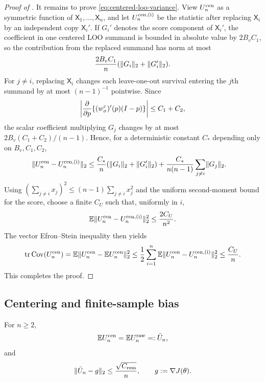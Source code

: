 \begin{proof}[Proof of ]
It remains to prove \eqref{eq:centered-loo-variance}.  View $U_n^{\rm cen}$ as a symmetric function of $\mathsf X_1,\ldots,\mathsf X_n$, and let $U_n^{\rm cen,(i)}$ be the statistic after replacing $\mathsf X_i$ by an independent copy $\mathsf X_i'$.  If $G_i'$ denotes the score component of $\mathsf X_i'$, the coefficient in one centered LOO summand is bounded in absolute value by $2B_vC_1$, so the contribution from the replaced summand has norm at most
\[
 \frac{2B_vC_1}{n}(\lVert G_i\rVert_2+\lVert G_i'\rVert_2).
\]
For $j\ne i$, replacing $\mathsf X_i$ changes each leave-one-out survival entering the $j$th summand by at most $(n-1)^{-1}$ pointwise.  Since
\[
 \left|\frac{\partial}{\partial p}\{(w_\sigma^\varepsilon)'(p)(I-p)\}\right|
 \le C_1+C_2,
\]
the scalar coefficient multiplying $G_j$ changes by at most
$2B_v(C_1+C_2)/(n-1)$.  Hence, for a deterministic constant $C_*$ depending only on $B_v,C_1,C_2$,
\begin{align*}
 \lVert U_n^{\rm cen}-U_n^{\rm cen,(i)}\rVert_2
 &\le \frac{C_*}{n}(\lVert G_i\rVert_2+\lVert G_i'\rVert_2)
 +\frac{C_*}{n(n-1)}\sum_{j\ne i}\lVert G_j\rVert_2.
\end{align*}
Using $(\sum_{j\ne i}x_j)^2\le(n-1)\sum_{j\ne i}x_j^2$ and the uniform second-moment bound for the score, choose a finite $C_U$ such that, uniformly in $i$,
\[
 \mathbb E\lVert U_n^{\rm cen}-U_n^{\rm cen,(i)}\rVert_2^2
 \le\frac{2C_U}{n^2}.
\]
The vector Efron--Stein inequality then yields
\[
 \operatorname{tr}\operatorname{Cov}(U_n^{\rm cen})
 =\mathbb E\lVert U_n^{\rm cen}-\mathbb E U_n^{\rm cen}\rVert_2^2
 \le\frac12\sum_{i=1}^{n}
 \mathbb E\lVert U_n^{\rm cen}-U_n^{\rm cen,(i)}\rVert_2^2
 \le\frac{C_U}{n}.
\]
This completes the proof.
\end{proof}


\subsection{Centering and finite-sample bias}

\begin{lemma}\label{lem:centering-expectation}
For $n\ge2$,
\begin{equation}\label{eq:centered-raw-mean}
 \mathbb E U_n^{\rm cen}=\mathbb E U_n^{\rm raw}=: \bar U_n,
\end{equation}
and
\begin{equation}\label{eq:loo-bias-order}
 \lVert\bar U_n-g\rVert_2\le \frac{\sqrt{C_{\rm rem}}}{n},
 \qquad g:=\nabla J(\theta).
\end{equation}
\end{lemma}

